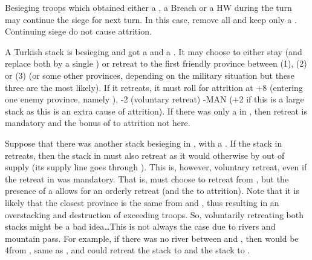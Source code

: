 \bparag Besieging troops which obtained either a \USURE\Faceplus, a Breach or
a HW during the turn may continue the siege for next turn.
\bparag In this case, remove all \USURE and keep only a \USURE\Facemoins.
\bparag Continuing siege do not cause attrition.

\begin{exemple}
  A Turkish stack is besieging \provinceBanat and got a \USURE\Faceplus and a
  \USURE\Facemoins. It may choose to either stay (and replace both \USURE by a
  single \USURE\Facemoins) or retreat to the first friendly province between
  \provinceValahia (1\MP), \provinceSerbia (2\MP) or \provinceBulgaristan
  (3\MP) (or some other provinces, depending on the military situation but
  these three are the most likely). If it retreats, it must roll for attrition
  at +8 (entering one enemy province, namely \provinceBanat), -2 (voluntary
  retreat) -MAN (+2 if this is a large stack as this is an extra cause of
  attrition). If there was only a \USURE\Facemoins in \provinceBanat, then
  retreat is mandatory and the bonus of  to attrition not here.
\end{exemple}  

\begin{exemple}
  Suppose that there was another stack besieging \villeBuda in
  \provinceMagyarorszag, with a \USURE\Faceplus. If the stack in
  \provinceBanat retreats, then the stack in \provinceMagyarorszag must also
  retreat as it would otherwise by out of supply (its supply line goes through
  \provinceBanat). This is, however, voluntary retreat, even if the retreat in
  \provinceBanat was mandatory. That is, \TUR must choose to retreat from
  \provinceMagyarorszag, but the presence of a \USURE\Faceplus allows for an
  orderly retreat (and the  to attrition). Note that it is likely
  that the closest province is the same from \provinceBanat and
  \provinceMagyarorszag, thus resulting in an overstacking and destruction of
  exceeding troops. So, voluntarily retreating both stacks might be a bad
  idea\ldots This is not always the case due to rivers and mountain pass. For
  example, if there was no river between \provinceMagyarorszag and
  \provinceCroatie, then \provinceSerbia would be 4\MP from
  \provinceMagyarorszag, same as \provinceValahia, and \TUR could retreat the
  \provinceBanat stack to \provinceValahia and the \provinceMagyarorszag stack
  to \provinceSerbia.
\end{exemple}  


